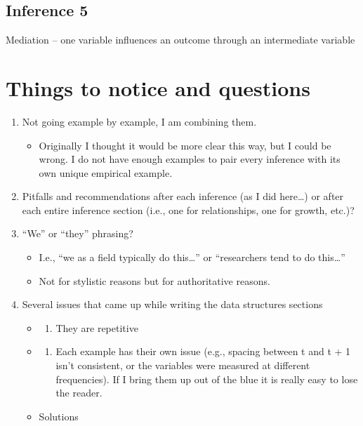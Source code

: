 \documentclass[english,,man]{apa6}
\providecommand{\tightlist}{%
  \setlength{\itemsep}{0pt}\setlength{\parskip}{0pt}}
\theoremstyle{definition}
\theoremstyle{definition}
\theoremstyle{definition}
\theoremstyle{remark}
\begin{document}
\hypertarget{inference-5-1}{%
\subsection{Inference 5}\label{inference-5-1}}

Mediation -- one variable influences an outcome through an intermediate
variable

\hypertarget{things-to-notice-and-questions}{%
\section{Things to notice and
questions}\label{things-to-notice-and-questions}}

\begin{enumerate}
\def\labelenumi{\arabic{enumi})}
\item
  Not going example by example, I am combining them.

  \begin{itemize}
  \tightlist
  \item
    Originally I thought it would be more clear this way, but I could be
    wrong. I do not have enough examples to pair every inference with
    its own unique empirical example.
  \end{itemize}
\item
  Pitfalls and recommendations after each inference (as I did
  here\ldots{}) or after each entire inference section (i.e., one for
  relationships, one for growth, etc.)?
\item
  \enquote{We} or \enquote{they} phrasing?

  \begin{itemize}
  \item
    I.e., \enquote{we as a field typically do this\ldots{}} or
    \enquote{researchers tend to do this\ldots{}}
  \item
    Not for stylistic reasons but for authoritative reasons.
  \end{itemize}
\item
  Several issues that came up while writing the data structures sections

  \begin{itemize}
  \item
    \begin{enumerate}
    \def\labelenumii{\arabic{enumii})}
    \tightlist
    \item
      They are repetitive
    \end{enumerate}
  \item
    \begin{enumerate}
    \def\labelenumii{\arabic{enumii})}
    \setcounter{enumii}{1}
    \tightlist
    \item
      Each example has their own issue (e.g., spacing between t and t +
      1 isn't consistent, or the variables were measured at different
      frequencies). If I bring them up out of the blue it is really easy
      to lose the reader.
    \end{enumerate}
  \item
    Solutions


\end{itemize}
\end{enumerate}
\end{document}
